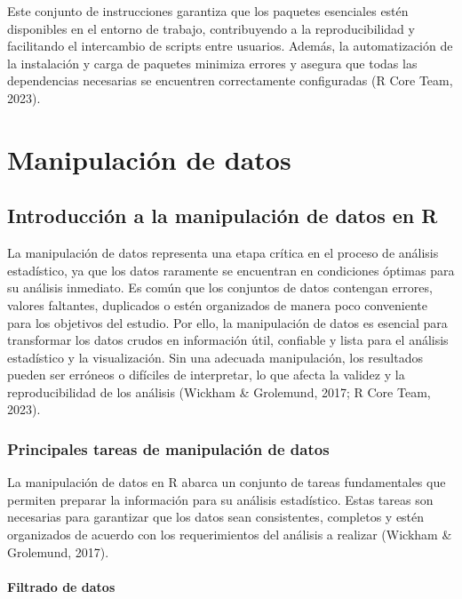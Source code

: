 \documentclass[
  spanish,
  a4paper,
  DIV=11,
  numbers=noendperiod,
  onepage,
  openany]{scrreprt}
\begin{document}
Este conjunto de instrucciones garantiza que los paquetes esenciales
estén disponibles en el entorno de trabajo, contribuyendo a la
reproducibilidad y facilitando el intercambio de scripts entre usuarios.
Además, la automatización de la instalación y carga de paquetes minimiza
errores y asegura que todas las dependencias necesarias se encuentren
correctamente configuradas (R Core Team, 2023).

\part{Manipulación de datos}


\chapter{Introducción a la manipulación de datos en
R}\label{introducciuxf3n-a-la-manipulaciuxf3n-de-datos-en-r}

La manipulación de datos representa una etapa crítica en el proceso de
análisis estadístico, ya que los datos raramente se encuentran en
condiciones óptimas para su análisis inmediato. Es común que los
conjuntos de datos contengan errores, valores faltantes, duplicados o
estén organizados de manera poco conveniente para los objetivos del
estudio. Por ello, la manipulación de datos es esencial para transformar
los datos crudos en información útil, confiable y lista para el análisis
estadístico y la visualización. Sin una adecuada manipulación, los
resultados pueden ser erróneos o difíciles de interpretar, lo que afecta
la validez y la reproducibilidad de los análisis (Wickham \& Grolemund,
2017; R Core Team, 2023).

\section{Principales tareas de manipulación de
datos}\label{principales-tareas-de-manipulaciuxf3n-de-datos}

La manipulación de datos en R abarca un conjunto de tareas fundamentales
que permiten preparar la información para su análisis estadístico. Estas
tareas son necesarias para garantizar que los datos sean consistentes,
completos y estén organizados de acuerdo con los requerimientos del
análisis a realizar (Wickham \& Grolemund, 2017).

\subsection{Filtrado de datos}\label{filtrado-de-datos}
\end{document}
